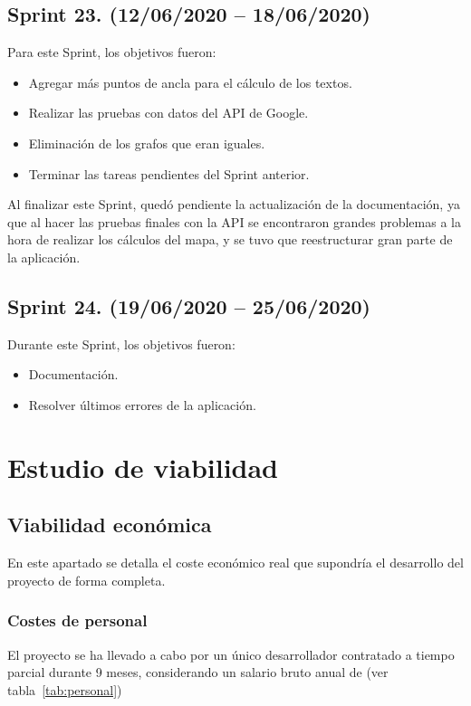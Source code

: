 \subsection{Sprint 23. (12/06/2020 -- 18/06/2020)}
Para este Sprint, los objetivos fueron:
\begin{itemize}
	\item Agregar más puntos de ancla para el cálculo de los textos.
	\item Realizar las pruebas con datos del API de Google.
	\item Eliminación de los grafos que eran iguales.
	\item Terminar las tareas pendientes del Sprint anterior.
\end{itemize}

Al finalizar este Sprint, quedó pendiente la actualización de la documentación, ya que al hacer las pruebas finales con la API se encontraron grandes problemas a la hora de realizar los cálculos del mapa, y se tuvo que reestructurar gran parte de la aplicación.

\subsection{Sprint 24. (19/06/2020 -- 25/06/2020)}
Durante este Sprint, los objetivos fueron:
\begin{itemize}
	\item Documentación.
	\item Resolver últimos errores de la aplicación.
\end{itemize}


\section{Estudio de viabilidad}

\subsection{Viabilidad económica}
En este apartado se detalla el coste económico real que supondría el desarrollo del proyecto de forma completa.

\subsubsection{Costes de personal}
El proyecto se ha llevado a cabo por un único desarrollador contratado a tiempo parcial durante 9 meses, considerando un salario  bruto anual de  (ver tabla~\ref{tab:personal})


